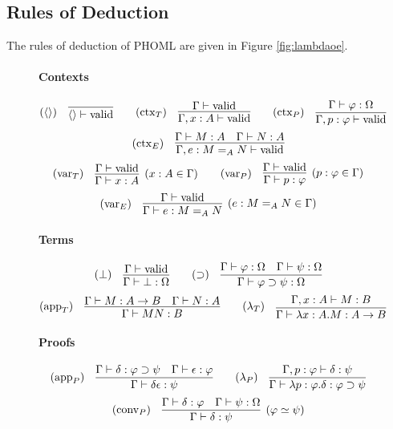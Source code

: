 \documentclass[a4paper,UKenglish]{lipics-v2016}
\newcommand*{\vald}{\ensuremath{\vdash \mathrm{valid}}}
\theoremstyle{plain}
\theoremstyle{definition}
\begin{document}
\subsection{Rules of Deduction}

The rules of deduction of PHOML are given in Figure \ref{fig:lambdaoe}.

\newcommand{\RvarT}{\ensuremath(\mathsf{varT})}
\begin{figure}
\paragraph*{Contexts}
$$ (\langle \rangle) \quad \vcenter{\infer{\langle \rangle \vald}{}} \qquad
(\mathrm{ctx}_T) \quad \vcenter{\infer{\Gamma, x : A \vald}{\Gamma \vald}} \qquad 
(\mathrm{ctx}_P) \quad \vcenter{\infer{\Gamma, p : \varphi \vald}{\Gamma \vdash \varphi : \Omega}} $$
$$ (\mathrm{ctx}_E) \quad \vcenter{\infer{\Gamma, e : M =_A N \vald}{\Gamma \vdash M : A \quad \Gamma \vdash N : A}} $$
$$ (\mathrm{var}_T) \quad \vcenter{\infer[(x : A \in \Gamma)]{\Gamma \vdash x : A}{\Gamma \vald}} \qquad
(\mathrm{var}_P) \quad \vcenter{\infer[(p : \varphi \in \Gamma)]{\Gamma \vdash p : \varphi}{\Gamma \vald}} $$
$$ (\mathrm{var}_E) \quad \vcenter{\infer[(e : M =_A N \in \Gamma)]{\Gamma \vdash e : M =_A N}{\Gamma \vald}} $$

\paragraph*{Terms}
$$ (\bot) \quad \vcenter{\infer{\Gamma \vdash \bot : \Omega}{\Gamma \vald}} \qquad
(\supset) \quad \vcenter{\infer{\Gamma \vdash \varphi \supset \psi : \Omega}{\Gamma \vdash \varphi : \Omega \quad \Gamma \vdash \psi : \Omega}} $$
$$ (\mathrm{app}_T) \quad \vcenter{\infer{\Gamma \vdash M N : B} {\Gamma \vdash M : A \rightarrow B \quad \Gamma \vdash N : A}} \qquad
(\lambda_T) \quad \vcenter{\infer{\Gamma \vdash \lambda x:A.M : A \rightarrow B}{\Gamma, x : A \vdash M : B}} $$

\paragraph*{Proofs}
$$ (\mathrm{app}_P) \quad \vcenter{\infer{\Gamma \vdash \delta \epsilon : \psi} {\Gamma \vdash \delta : \varphi \supset \psi \quad \Gamma \vdash \epsilon : \varphi}} \qquad
(\lambda_P) \quad \vcenter{\infer{\Gamma \vdash \lambda p : \varphi . \delta : \varphi \supset \psi}{\Gamma, p : \varphi \vdash \delta : \psi}} $$
$$ (\mathrm{conv}_P) \quad \vcenter{\infer[(\varphi \simeq \psi)]{\Gamma \vdash \delta : \psi}{\Gamma \vdash \delta : \varphi \quad \Gamma \vdash \psi : \Omega}} $$


\end{figure}
\end{document}
